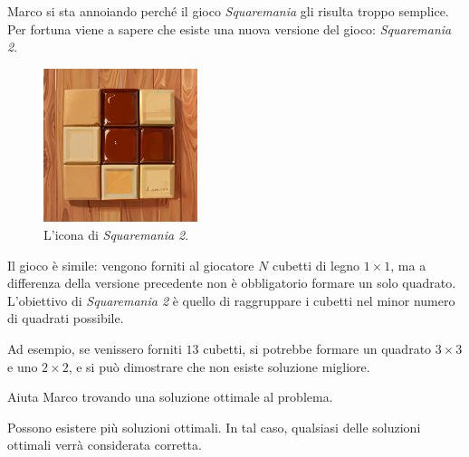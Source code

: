 \usepackage{xcolor}
\usepackage{afterpage}
\usepackage{pifont,mdframed}
\usepackage[bottom]{footmisc}
\usepackage{minted}

\newcommand{\inputfile}{\texttt{stdin}}
\newcommand{\outputfile}{\texttt{stdout}}
\makeatletter
\renewcommand{\this@inputfilename}{\texttt{stdin}}
\renewcommand{\this@outputfilename}{\texttt{stdout}}
\renewcommand{\this@syllabuslevel}{5}
\renewcommand{\this@custdifficulty}{3}
\makeatother

Marco si sta annoiando perché il gioco \textit{Squaremania} gli risulta troppo semplice.
Per fortuna viene a sapere che esiste una nuova versione del gioco: \textit{Squaremania 2}.
\begin{figure}[h]
    \centering
    \includegraphics[width=0.4\textwidth]{./woodoku2.png}
    \caption{L'icona di \textit{Squaremania 2}.}
\end{figure}

Il gioco è simile: vengono forniti al giocatore $N$ cubetti di legno $1\times1$, ma a differenza della
versione precedente non è obbligatorio formare un solo quadrato. L'obiettivo di \textit{Squaremania 2}
è quello di raggruppare i cubetti nel minor numero di quadrati possibile.

Ad esempio, se venissero forniti $13$ cubetti, si potrebbe formare un quadrato $3\times3$ e uno $2\times2$,
e si può dimostrare che non esiste soluzione migliore.

Aiuta Marco trovando una soluzione ottimale al problema.
\begin{warning}
    Possono esistere più soluzioni ottimali. In tal caso, qualsiasi delle soluzioni ottimali verrà considerata corretta.
\end{warning}


\Implementation

